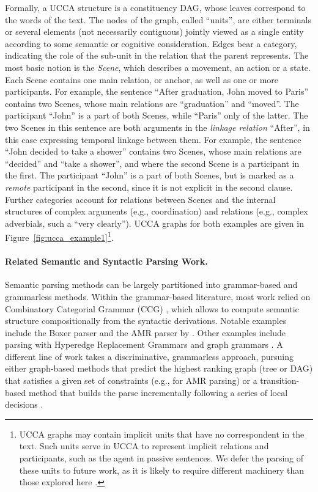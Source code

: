 \documentclass[11pt]{article}
\newcommand{\figref}[1]{Figure~\ref{#1}}
\begin{document}
Formally, a UCCA structure is a constituency DAG, whose leaves correspond to the words of the text. The
nodes of the graph, called ``units'', are either terminals or several elements (not necessarily contiguous)
jointly viewed as a single entity according to some semantic or cognitive consideration.
Edges bear a category, indicating the role of the sub-unit in the relation that the parent represents. 
The most basic notion is the {\it Scene}, which describes a movement, an action or a state.
Each Scene contains one main relation, or anchor, as well as one or more participants.
For example, the sentence ``After graduation, John moved to Paris'' contains two Scenes,
whose main relations are ``graduation'' and ``moved''. The participant ``John'' is a part of both Scenes, while ``Paris'' only of the latter.
The two Scenes in this sentence are both arguments in the \textit{linkage relation} ``After'', in this case expressing temporal linkage between them.
For example, the sentence ``John decided to take a shower'' contains two Scenes, whose main relations are ``decided'' and ``take a shower'', and where the second Scene is a participant in the first.
The participant ``John'' is a part of both Scenes, but is marked as a \textit{remote} participant in
the second, since it is not explicit in the second clause.
Further categories account for relations between Scenes and
the internal structures of complex arguments (e.g., coordination) and relations (e.g., complex adverbials, such a ``very clearly'').
UCCA graphs for both examples are given in \figref{fig:ucca_example1}\footnote{
UCCA graphs may contain implicit units that have no correspondent in the text.
Such units serve in UCCA to represent implicit relations and participants,
such as the agent in passive sentences.
We defer the parsing of these units to future work,
as it is likely to require different machinery than
those explored here \cite{roth2015inducing}.}.
  

\paragraph{Related Semantic and Syntactic Parsing Work.}
Semantic parsing methods can be largely partitioned into grammar-based and grammarless methods.
Within the grammar-based literature, most work relied on Combinatory Categorial Grammar (CCG)
\cite{Steedman:00}, which allows to compute semantic structure compositionally from the
syntactic derivations. Notable examples include the Boxer parser \cite{bos2005towards}
and the AMR parser by .
Other examples include parsing with Hyperedge Replacement Grammars
\cite{jones2012semantics,chiang2013parsing,peng2015synchronous} and
graph grammars \cite{koller2015semantic}.
A different line of work takes a discriminative, grammarless approach,
pursuing either graph-based methods that predict the highest ranking graph
(tree or DAG) that satisfies a given set of constraints
(e.g.,  for AMR parsing)
or a transition-based method that builds the parse incrementally following a series of local
decisions \cite[and much subsequent work]{Nivre03anefficient}.
\end{document}
